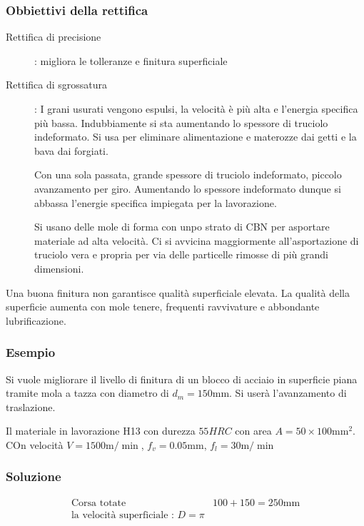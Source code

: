 \subsubsection{Obbiettivi della rettifica}
\begin{description}
\item[Rettifica di precisione]: migliora le tolleranze e finitura superficiale
\item[Rettifica di sgrossatura]: I grani usurati vengono espulsi, la velocità è più alta e l'energia specifica più bassa. Indubbiamente si sta aumentando lo spessore di truciolo indeformato.
Si usa per eliminare alimentazione e materozze dai getti e la bava dai forgiati.
\item[] Con una sola passata, grande spessore di truciolo indeformato, piccolo avanzamento per giro.
Aumentando lo spessore indeformato dunque si abbassa l'energie specifica impiegata per la lavorazione.
\item[] Si usano delle mole di forma con unpo strato di CBN per asportare materiale ad alta velocità. Ci si avvicina maggiormente all'asportazione di truciolo vera e propria per via delle particelle rimosse di più grandi dimensioni.
\end{description}

Una buona finitura non garantisce qualità superficiale elevata.
La qualità della superficie aumenta con mole tenere, frequenti ravvivature e abbondante lubrificazione.

\subsubsection*{Esempio}
Si vuole migliorare il livello di finitura di un blocco di acciaio in superficie piana tramite mola a tazza con diametro di $d_m = 150\unit{\mm}$. Si userà l'avanzamento di traslazione.

Il materiale in lavorazione H13 con durezza $55\unit{HRC}$
con area $A = 50 \times 100 \unit{\mm^2}$.
COn velocità $V = 1500\unit{\m/\min}$, $f_v = 0.05\unit{\mm}$, $f_l = 30\unit{\m/\min}$
\subsubsection*{Soluzione}
\begin{align*}
\text{Corsa totate} & 100 + 150 = 250\unit{\mm}\\
\text{la velocità superficiale : } D = \pi \\
\end{align*}

